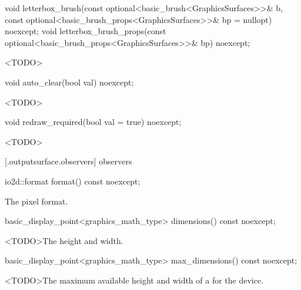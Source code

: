 %
\begin{itemdecl}
void letterbox_brush(const optional<basic_brush<GraphicsSurfaces>>& b,
  const optional<basic_brush_props<GraphicsSurfaces>>& bp = nullopt) noexcept;
void letterbox_brush_props(const optional<basic_brush_props<GraphicsSurfaces>>& bp) noexcept;
\end{itemdecl}
\begin{itemdescr}
\pnum
\effects
<TODO>
\end{itemdescr}

%
\begin{itemdecl}
void auto_clear(bool val) noexcept;
\end{itemdecl}
\begin{itemdescr}
\pnum
\effects
<TODO>
\end{itemdescr}

%
\begin{itemdecl}
void redraw_required(bool val = true) noexcept;
\end{itemdecl}
\begin{itemdescr}
\pnum
\effects
<TODO>
\end{itemdescr}

 [\iotwod.outputsurface.observers] { observers}

%
\begin{itemdecl}
io2d::format format() const noexcept;
\end{itemdecl}
\begin{itemdescr}
\pnum
\returns
The pixel format.
\end{itemdescr}

%
\begin{itemdecl}
basic_display_point<graphics_math_type> dimensions() const noexcept;
\end{itemdecl}
\begin{itemdescr}
\pnum
\returns
<TODO>The height and width.
\end{itemdescr}

%
\begin{itemdecl}
basic_display_point<graphics_math_type> max_dimensions() const noexcept;
\end{itemdecl}
\begin{itemdescr}
\pnum
\returns
<TODO>The maximum available height and width of a  for the device.
\end{itemdescr}

